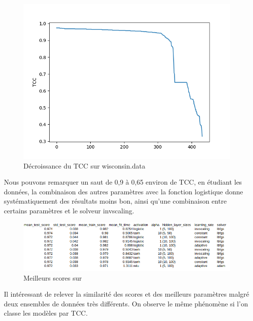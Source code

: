 \documentclass[10pt,letterpaper]{article}
\begin{document}
\begin{figure}[H]
\centering
\includegraphics[scale=0.65]{wisc_pmc_2.png}
\caption{Décroissance du TCC sur wisconsin.data}
\end{figure}

Nous pouvons remarquer un saut de 0,9 à 0,65 environ de TCC, en étudiant les données, la combinaison des autres paramètres avec la fonction logistique donne systématiquement des résultats moins bon, ainsi qu’une combinaison entre certains paramètres et le solveur invscaling.


\begin{figure}[H]
\centering
\includegraphics[scale=0.65]{dj_pmc_1.png}
\caption{Meilleurs scores sur \protect{}}
\end{figure}

Il intéressant de relever la similarité des scores et des meilleurs paramètres malgré deux ensembles de données très différents.
On observe le même phénomène si l’on classe les modèles par TCC.
\end{document}
